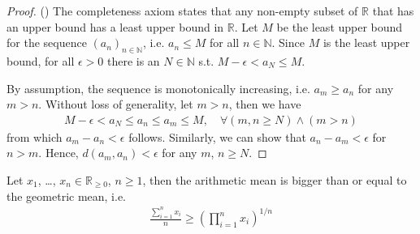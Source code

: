 \begin{proof}(\cite{2169936})
	The completeness axiom states that any non-empty subset of $\mathbb R$ that has an upper bound has a least upper bound in $\mathbb R$. Let $M$ be the least upper bound for the sequence $(a_n)_{n\in\mathbb N}$, i.e. $a_n \leq M$ for all $n\in\mathbb N$. Since $M$ is the least upper bound, for all $\epsilon > 0$ there is an $N\in\mathbb N$ s.t. $M - \epsilon < a_N \leq M$.
	
	By assumption, the sequence is monotonically increasing, i.e. $a_m \geq a_n$ for any $m > n$. Without loss of generality, let $m > n$, then we have
	\begin{align}\label{eq:mono_inc_seq_Cauchy}
		M - \epsilon < a_N \leq a_n \leq a_m \leq M, \quad \forall (m, n\geq N) \wedge (m > n)
	\end{align}
	from which $a_m - a_n < \epsilon$ follows. Similarly, we can show that $a_n - a_m < \epsilon$ for $n > m$. Hence, $d(a_m, a_n) < \epsilon$ for any $m$, $n\geq N$.
\end{proof}

\begin{theorem}\label{thrm:AM-GM}
	Let $x_1$, \dots, $x_n\in\mathbb R_{\geq 0}$, $n\geq 1$, then the arithmetic mean is bigger than or equal to the geometric mean, i.e.
	\begin{align}\label{eq:AM-GM}
		\frac{\sum_{i=1}^{n} x_i}{n} \geq \left(\prod_{i=1}^{n}x_i\right)^{1/n}
	\end{align}
\end{theorem}

